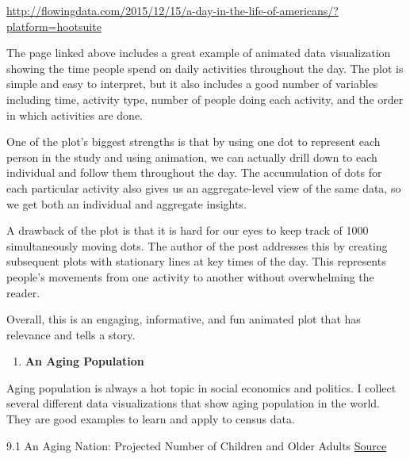 \documentclass[]{book}
\providecommand{\tightlist}{%
  \setlength{\itemsep}{0pt}\setlength{\parskip}{0pt}}
\theoremstyle{definition}
\theoremstyle{definition}
\theoremstyle{definition}
\theoremstyle{remark}
\begin{document}
\url{http://flowingdata.com/2015/12/15/a-day-in-the-life-of-americans/?platform=hootsuite}

The page linked above includes a great example of animated data
visualization showing the time people spend on daily activities
throughout the day. The plot is simple and easy to interpret, but it
also includes a good number of variables including time, activity type,
number of people doing each activity, and the order in which activities
are done.

One of the plot's biggest strengths is that by using one dot to
represent each person in the study and using animation, we can actually
drill down to each individual and follow them throughout the day. The
accumulation of dots for each particular activity also gives us an
aggregate-level view of the same data, so we get both an individual and
aggregate insights.

A drawback of the plot is that it is hard for our eyes to keep track of
1000 simultaneously moving dots. The author of the post addresses this
by creating subsequent plots with stationary lines at key times of the
day. This represents people's movements from one activity to another
without overwhelming the reader.

Overall, this is an engaging, informative, and fun animated plot that
has relevance and tells a story.

\begin{enumerate}
\def\labelenumi{\arabic{enumi}.}
\setcounter{enumi}{8}
\tightlist
\item
  \textbf{An Aging Population}
\end{enumerate}

Aging population is always a hot topic in social economics and politics.
I collect several different data visualizations that show aging
population in the world. They are good examples to learn and apply to
census data.

9.1 An Aging Nation: Projected Number of Children and Older Adults
\href{https://www.census.gov/library/visualizations/2018/comm/historic-first.html}{Source}
\end{document}
